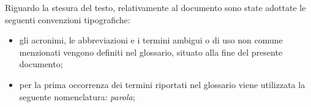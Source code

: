 Riguardo la stesura del testo, relativamente al documento sono state adottate le seguenti convenzioni tipografiche:
\begin{itemize}
	\item gli acronimi, le abbreviazioni e i termini ambigui o di uso non comune menzionati vengono definiti nel glossario, situato alla fine del presente documento;
	\item per la prima occorrenza dei termini riportati nel glossario viene utilizzata la seguente nomenclatura: \emph{parola}\glsfirstoccur;
\end{itemize}